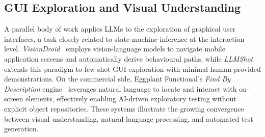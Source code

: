 \subsection{GUI Exploration and Visual Understanding}
\label{sec:rw_gui}

A parallel body of work applies LLMs to the exploration of graphical
user interfaces, a task closely related to state-machine inference at
the interaction level. \emph{VisionDroid}~\cite{visiondroid} employs
vision-language models to navigate mobile application screens and
automatically derive behavioural paths, while \emph{LLMShot} extends
this paradigm to few-shot GUI exploration with minimal human-provided
demonstrations. On the commercial side, Eggplant Functional's
\emph{Find By Description} engine~\cite{eggplant_ai} leverages natural
language to locate and interact with on-screen elements, effectively
enabling AI-driven exploratory testing without explicit object
repositories. These systems illustrate the growing convergence between
visual understanding, natural-language processing, and automated test
generation.

